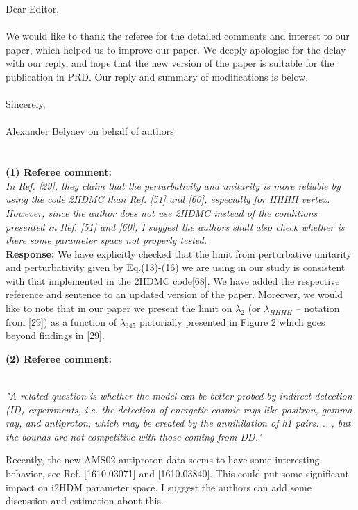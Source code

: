 \documentclass[11pt]{article}
\begin{document}
\noindent 
Dear Editor, 
\\
\\
We would like to thank the referee for the detailed comments and interest to our paper,
which helped us to improve our paper.
We deeply apologise for the delay with our reply,
and hope that the new version of the paper is suitable for the publication in PRD.
Our reply and summary of modifications is below.
\\
\\
\noindent Sincerely, 
\\
\\
\noindent 
Alexander Belyaev on behalf of authors
\\
\\
\\
{\bf (1) Referee comment:} { \it \\
In Ref. [29], they claim that the perturbativity and unitarity is
more reliable by using the code 2HDMC than Ref. [51] and [60],
especially for HHHH vertex. However, since the author does not use
2HDMC instead of the conditions presented in Ref. [51] and [60], I
suggest the authors shall also check whether is there some parameter
space not properly tested.
}\\

{\bf Response:} 
We have explicitly checked that the limit
from perturbative unitarity and perturbativity given by Eq.(13)-(16) we are using in our study is
consistent with that implemented in the 2HDMC code[68].
We have added the respective reference and sentence to an updated version of the paper.
Moreover, we would like to note that in our paper we present the limit on $\lambda_2$ (or $\lambda_{HHHH}$  -- notation from [29])
as a function of $\lambda_{345}$ pictorially presented in Figure 2 which goes beyond findings in [29].

\bigskip

\noindent
{\bf (2) Referee comment:} {\it  \\
"A related question is whether the model can be better probed by
indirect detection (ID) experiments, i.e. the detection of energetic
cosmic rays like positron, gamma ray, and antiproton, which may be
created by the annihilation of h1 pairs. ..., but the bounds are not
competitive with those coming from DD."

Recently, the new AMS02 antiproton data seems to have some interesting
behavior, see Ref. [1610.03071] and [1610.03840]. This could put some
significant impact on i2HDM parameter space. I suggest the authors can
add some discussion and estimation about this.
}
\end{document}
